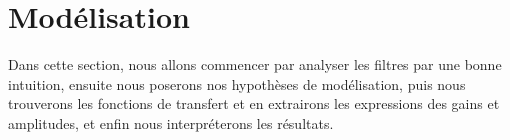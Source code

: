 \section{Modélisation}
\label{sec:filtres/mode}

Dans cette section, nous allons commencer par analyser les filtres
par une bonne intuition,
ensuite nous poserons nos hypothèses de modélisation,
puis nous trouverons les fonctions de transfert et en extrairons
les expressions des gains et amplitudes,
et enfin nous interpréterons les résultats.






